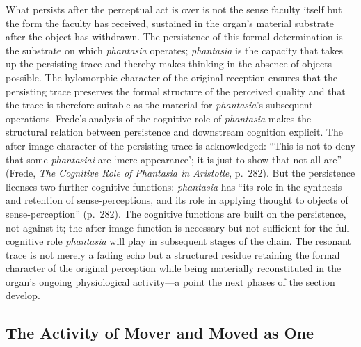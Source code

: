 What persists after the perceptual act is over is not the sense faculty itself but the form the faculty has received, sustained in the organ's material substrate after the object has withdrawn. The persistence of this formal determination is the substrate on which \textit{phantasia} operates; \textit{phantasia} is the capacity that takes up the persisting trace and thereby makes thinking in the absence of objects possible. The hylomorphic character of the original reception ensures that the persisting trace preserves the formal structure of the perceived quality and that the trace is therefore suitable as the material for \textit{phantasia}'s subsequent operations. Frede's analysis of the cognitive role of \textit{phantasia} makes the structural relation between persistence and downstream cognition explicit. The after-image character of the persisting trace is acknowledged: ``This is not to deny that some \textit{phantasiai} are `mere appearance'; it is just to show that not all are'' (Frede, \textit{The Cognitive Role of Phantasia in Aristotle}, p.~282). But the persistence licenses two further cognitive functions: \textit{phantasia} has ``its role in the synthesis and retention of sense-perceptions, and its role in applying thought to objects of sense-perception'' (p.~282). The cognitive functions are built on the persistence, not against it; the after-image function is necessary but not sufficient for the full cognitive role \textit{phantasia} will play in subsequent stages of the chain. The resonant trace is not merely a fading echo but a structured residue retaining the formal character of the original perception while being materially reconstituted in the organ's ongoing physiological activity---a point the next phases of the section develop.

\subsection{The Activity of Mover and Moved as One}

